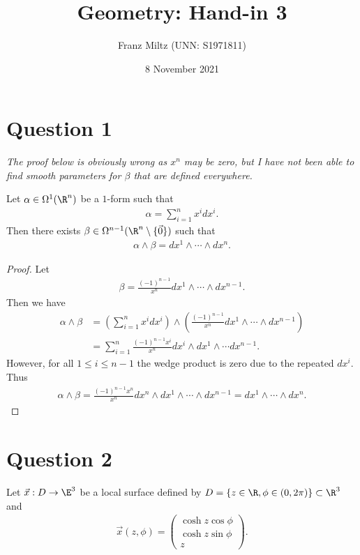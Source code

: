 \documentclass{article}
\begin{document}
\title{Geometry: Hand-in 3}
\author{Franz Miltz (UNN: S1971811)}
\date{8 November 2021}
\maketitle

\section*{Question 1}

\emph{The proof below is obviously wrong as $x^n$ may be zero,
but I have not been able to find smooth parameters for $\beta$ that are defined everywhere.}

\begin{claim*}
   Let $\alpha\in\Omega^1(\R^n)$ be a $1$-form such that 
   \begin{align*}
      \alpha=\sum_{i=1}^n x^idx^i.
   \end{align*}
   Then there exists $\beta\in\Omega^{n-1}(\R^n\setminus\{\vec 0\})$ such that 
   \begin{align*}
      \alpha\wedge\beta = dx^1\wedge\cdots\wedge dx^n.
   \end{align*}
\end{claim*}
\begin{proof}
   Let 
   \begin{align*}
      \beta = \frac{(-1)^{n-1}}{x^n}dx^1\wedge\cdots\wedge dx^{n-1}.
   \end{align*}
   Then we have 
   \begin{align*}
      \alpha\wedge\beta &= \left(\sum_{i=1}^n x^idx^i\right) \wedge \left(\frac{(-1)^{n-1}}{x^n}dx^1\wedge\cdots\wedge dx^{n-1}\right)\\
                        &= \sum_{i=1}^n \frac{(-1)^{n-1}x^i}{x^n}dx^i\wedge dx^1 \wedge \cdots dx^{n-1}.
   \end{align*}
   However, for all $1\leq i\leq n-1$ the wedge product is zero due to the repeated $dx^i$. Thus 
   \begin{align*}
      \alpha\wedge\beta = \frac{(-1)^{n-1}x^n}{x^n}dx^n\wedge dx^1\wedge\cdots\wedge dx^{n-1}=dx^1\wedge\cdots\wedge dx^n.
   \end{align*}
\end{proof}

\section*{Question 2}

Let $\vec x: D\to\E^3$ be a local surface defined by $D=\{z\in\R,\phi\in(0,2\pi)\}\subset\R^3$ and 
\begin{align*}
   \vec x(z,\phi)=\begin{pmatrix}
      \cosh z \cos\phi \\ \cosh z \sin\phi \\ z
   \end{pmatrix}.
\end{align*}
\end{document}
